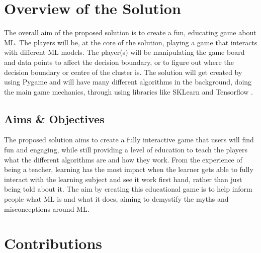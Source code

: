 	\section{Overview of the Solution}
		\label{sec:overview_of_solution}
	The overall aim of the proposed solution is to create a fun, educating game about ML. The players will be, at the core of the solution, playing a game that interacts with different ML models. The player(s) will be manipulating the game board and data points to affect the decision boundary, or to figure out where the decision boundary or centre of the cluster is. The solution will get created by using  Pygame and will have many different algorithms in the background, doing the main game mechanics, through using libraries like SKLearn \cite{sklearn_api} and Tensorflow \cite{tensorflow2015-whitepaper}.
	
		
	
	
	
		
		
	
	\subsection{Aims \& Objectives}
		\label{sec:intro_objective} 
		
		The proposed solution aims to create a fully interactive game that users will find fun and engaging, while still providing a level of education to teach the players what the different algorithms are and how they work. From the experience of being a teacher, learning has the most impact when the learner gets able to fully interact with the learning subject and see it work first hand, rather than just being told about it. The aim by creating this educational game is to help inform people what ML is and what it does, aiming to demystify the myths and misconceptions around ML.
		
	
	
	\section{Contributions} 
		\label{sec:intro_contribs} 
		

